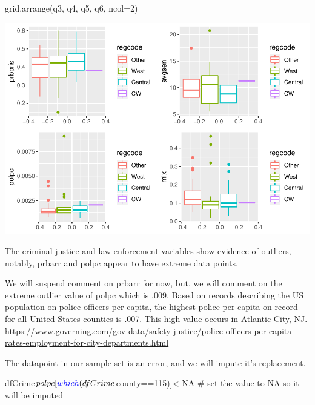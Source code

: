 \documentclass[]{article}
\newenvironment{Shaded}{}{}
\newcommand{\CommentTok}[1]{\textcolor[rgb]{0.00,0.50,0.00}{#1}}
\newcommand{\DataTypeTok}[1]{#1}
\newcommand{\DecValTok}[1]{#1}
\newcommand{\KeywordTok}[1]{\textcolor[rgb]{0.00,0.00,1.00}{#1}}
\newcommand{\NormalTok}[1]{#1}
\newcommand{\OperatorTok}[1]{#1}
\newcommand{\OtherTok}[1]{\textcolor[rgb]{1.00,0.25,0.00}{#1}}
\begin{document}
\begin{Shaded}
\begin{Highlighting}[]
\KeywordTok{grid.arrange}\NormalTok{(q3, q4, q5, q6, }\DataTypeTok{ncol=}\DecValTok{2}\NormalTok{)}
\end{Highlighting}
\end{Shaded}

\includegraphics{Bagnard_Gaustad_Hartman_Leung_Lab_3_files/figure-latex/unnamed-chunk-22-2.pdf}

The criminal justice and law enforcement variables show evidence of
outliers, notably, prbarr and polpc appear to have extreme data points.

We will suspend comment on prbarr for now, but, we will comment on the
extreme outlier value of polpc which is .009. Based on records
describing the US population on police officers per capita, the highest
police per capita on record for all United States counties is .007. This
high value occurs in Atlantic City, NJ.
\url{https://www.governing.com/gov-data/safety-justice/police-officers-per-capita-rates-employment-for-city-departments.html}

The datapoint in our sample set is an error, and we will impute it's
replacement.

\begin{Shaded}
\begin{Highlighting}[]
\NormalTok{dfCrime}\OperatorTok{$}\NormalTok{polpc[}\KeywordTok{which}\NormalTok{(dfCrime}\OperatorTok{$}\NormalTok{county}\OperatorTok{==}\DecValTok{115}\NormalTok{)]<-}\OtherTok{NA} \CommentTok{# set the value to NA so it will be imputed}
\end{Highlighting}
\end{Shaded}
\end{document}

